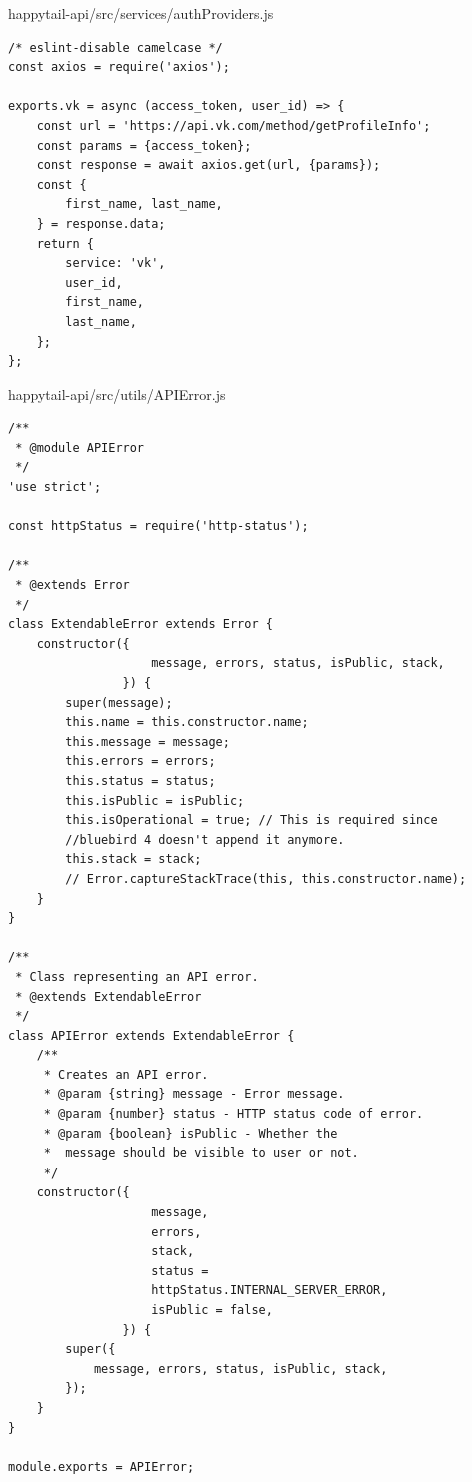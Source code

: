 \documentclass[12pt]{article}
\begin{document}
  \normalsize
 happytail-api/src/services/authProviders.js
 \footnotesize
\begin{verbatim}
/* eslint-disable camelcase */
const axios = require('axios');

exports.vk = async (access_token, user_id) => {
    const url = 'https://api.vk.com/method/getProfileInfo';
    const params = {access_token};
    const response = await axios.get(url, {params});
    const {
        first_name, last_name,
    } = response.data;
    return {
        service: 'vk',
        user_id,
        first_name,
        last_name,
    };
};

 \end{verbatim}
 
  \normalsize
 happytail-api/src/utils/APIError.js
 \footnotesize
\begin{verbatim}
/**
 * @module APIError
 */
'use strict';

const httpStatus = require('http-status');

/**
 * @extends Error
 */
class ExtendableError extends Error {
    constructor({
                    message, errors, status, isPublic, stack,
                }) {
        super(message);
        this.name = this.constructor.name;
        this.message = message;
        this.errors = errors;
        this.status = status;
        this.isPublic = isPublic;
        this.isOperational = true; // This is required since 
        //bluebird 4 doesn't append it anymore.
        this.stack = stack;
        // Error.captureStackTrace(this, this.constructor.name);
    }
}

/**
 * Class representing an API error.
 * @extends ExtendableError
 */
class APIError extends ExtendableError {
    /**
     * Creates an API error.
     * @param {string} message - Error message.
     * @param {number} status - HTTP status code of error.
     * @param {boolean} isPublic - Whether the 
     *  message should be visible to user or not.
     */
    constructor({
                    message,
                    errors,
                    stack,
                    status = 
                    httpStatus.INTERNAL_SERVER_ERROR,
                    isPublic = false,
                }) {
        super({
            message, errors, status, isPublic, stack,
        });
    }
}

module.exports = APIError;

 \end{verbatim}
 
\end{document}
